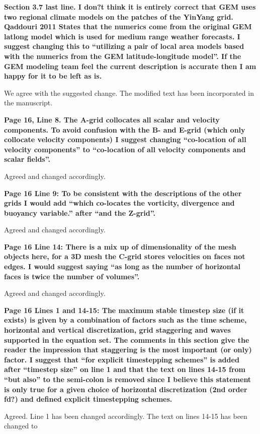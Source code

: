 \documentclass{article}
\begin{document}
\textbf{{Section 3.7 last line. I don?t think it is entirely correct that GEM uses two regional
climate models on the patches of the YinYang grid. Qaddouri 2011 States that the
numerics come from the original GEM latlong model which is used for medium
range weather forecasts. I suggest changing this to ``utilizing a pair of local area
models based with the numerics from the GEM latitude-longitude model''. If the
GEM modeling team feel the current description is accurate then I am happy for
it to be left as is.}}

We agree with the suggested change.  The modified text has been incorporated in the manuscript.

\textbf{{Page 16, Line 8. The A-grid collocates all scalar and velocity components. To
avoid confusion with the B- and E-grid (which only collocate velocity components)
I suggest changing ``co-location of all velocity components'' to ``co-location of all
velocity components and scalar fields''.}}

Agreed and changed accordingly.

\textbf{{Page 16 Line 9: To be consistent with the descriptions of the other grids I would
add ``which co-locates the vorticity, divergence and buoyancy variable.'' after ``and
the Z-grid''.}}

Agreed and changed accordingly.

\textbf{{Page 16 Line 14: There is a mix up of dimensionality of the mesh objects here,
for a 3D mesh the C-grid stores velocities on faces not edges. I would suggest
saying ``as long as the number of horizontal faces is twice the number of volumes''.}}

Agreed and changed accordingly.

\textbf{{Page 16 Lines 1 and 14-15: The maximum stable timestep size (if it exists) is
given by a combination of factors such as the time scheme, horizontal and vertical
discretization, grid staggering and waves supported in the equation set. The
comments in this section give the reader the impression that staggering is the
most important (or only) factor. I suggest that ``for explicit timestepping schemes''
is added after ``timestep size'' on line 1 and that the text on lines 14-15 from ``but
also'' to the semi-colon is removed since I believe this statement is only true for
a given choice of horizontal discretization (2nd order fd?) and defined explicit
timestepping schemes.}}

Agreed.  Line 1 has been changed accordingly.  The text on lines 14-15 has been changed to 
\end{document}
